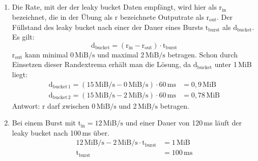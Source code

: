 \documentclass[a4paper,
			llpt,
			solution,
			accentcolor=tud2d,
			colorbacktitle
			]
			{tudexercise}
\newcommand{\MiBs}{\,\mathrm{MiB}/\mathrm{s}}
\begin{document}
\subsection{}
\begin{enumerate}
\item
Die Rate, mit der der leaky bucket Daten empfängt, wird hier als $\mathrm{r}_{\mathrm{in}}$ bezeichnet, die in der Übung als $\mathrm{r}$ bezeichnete Outputrate als $\mathrm{r}_{\mathrm{out}}$. Der Füllstand des leaky bucket nach einer der Dauer eines Bursts $\mathrm{t}_\mathrm{burst}$ als $\mathrm{d}_\mathrm{bucket}$. Es gilt:
$$\mathrm{d}_\mathrm{bucket} = \left(\mathrm{r}_\mathrm{in} - \mathrm{r}_\mathrm{out}\right) \cdot \mathrm{t}_\mathrm{burst}$$
$\mathrm{r}_\mathrm{out}$ kann minimal $0\MiBs$ und maximal $2\MiBs$ betragen. Schon durch Einsetzen dieser Randextrema erhält man die Lösung, da $\mathrm{d}_\mathrm{bucket}$ unter 1\,MiB liegt:
\begin{align*}
\mathrm{d}_\mathrm{bucket\,1} = \left(15\MiBs - 0\MiBs\right) \cdot 60\mathrm{\,ms} &= 0,9\mathrm{ \,MiB}\\
\mathrm{d}_\mathrm{bucket\,2} = \left(15\MiBs - 2\MiBs\right) \cdot 60\mathrm{\,ms} &= 0,78\mathrm{\,MiB}
\end{align*}
Antwort: r darf zwischen 0$\MiBs$ und 2$\MiBs$ betragen.
\item
Bei einem Burst mit $\mathrm{t}_\mathrm{in} = 12\MiBs$ und einer Dauer von 120\,ms läuft der leaky bucket nach 100\,ms über.
\begin{align*}
12 \MiBs - 2 \MiBs \cdot \mathrm{t}_\mathrm{burst} &= 1\,\mathrm{MiB} \\
\mathrm{t}_\mathrm{burst} &= 100\mathrm{\,ms}
\end{align*}
\end{enumerate}
\end{document}
